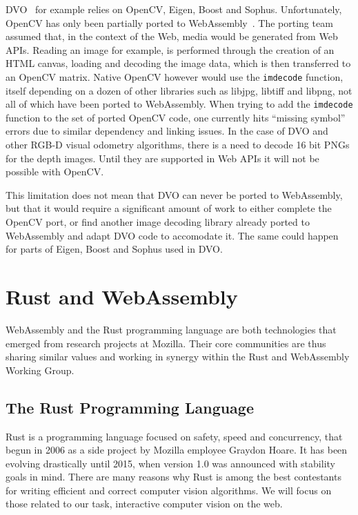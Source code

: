 DVO~\cite{steinbrucker2011real} for example relies on OpenCV, Eigen, Boost and Sophus.
Unfortunately, OpenCV has only been partially ported to WebAssembly~\cite{taheri2018opencv}.
The porting team assumed that, in the context of the Web,
media would be generated from Web APIs.
Reading an image for example, is performed through the creation of an HTML canvas,
loading and decoding the image data, which is then transferred to an OpenCV matrix.
Native OpenCV however would use the \verb|imdecode| function,
itself depending on a dozen of other libraries such as libjpg, libtiff and libpng,
not all of which have been ported to WebAssembly.
When trying to add the \verb|imdecode| function to the set of ported OpenCV code,
one currently hits ``missing symbol'' errors due to similar dependency and linking issues.
In the case of DVO and other RGB-D visual odometry algorithms,
there is a need to decode 16 bit PNGs for the depth images.
Until they are supported in Web APIs it will not be possible with OpenCV.

This limitation does not mean that DVO can never be ported to WebAssembly,
but that it would require a significant amount of work to either
complete the OpenCV port, or find another image decoding library
already ported to WebAssembly and adapt DVO code to accomodate it.
The same could happen for parts of Eigen, Boost and Sophus used in DVO.

\section{Rust and WebAssembly}%
\label{sec:rust_wasm}

WebAssembly and the Rust programming language are both technologies
that emerged from research projects at Mozilla.
Their core communities are thus sharing similar values
and working in synergy within the Rust and WebAssembly Working Group.

\subsection{The Rust Programming Language}%
\label{sub:rust_language}

Rust is a programming language focused on safety, speed and concurrency,
that begun in 2006 as a side project by Mozilla employee Graydon Hoare.
It has been evolving drastically until 2015, when version 1.0 was announced
with stability goals in mind.
There are many reasons why Rust is among the best contestants
for writing efficient and correct computer vision algorithms.
We will focus on those related to our task,
interactive computer vision on the web.

